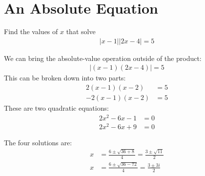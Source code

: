 \documentclass[12pt]{article}
\begin{document}
\begin{answer}

\end{answer}


\section*{An Absolute Equation}
Find the values of $x$ that solve
\begin{align*} 
|x-1| |2x-4| = 5
\end{align*}


\begin{answer}
We can bring the absolute-value operation outside of the product:
\begin{align*} 
|(x-1)(2x-4)| = 5
\end{align*}
This can be broken down into two parts:
\begin{align*} 
2(x-1)(x-2) & = 5 \\
- 2(x-1)(x-2) & = 5
\end{align*}
These are two quadratic equations:
\begin{align*} 
2x^2-6x-1 & = 0 \\
2x^2-6x+9 & = 0
\end{align*}

The four solutions are:
\begin{align*} 
x & = \frac{6 \pm \sqrt{36+8}}{4} = \frac{3 \pm \sqrt{11}}{2} \\
x & = \frac{6 \pm \sqrt{36-72}}{4} = \frac{3 \pm 3i}{2} \\
\end{align*}

\end{answer}
\end{document}
